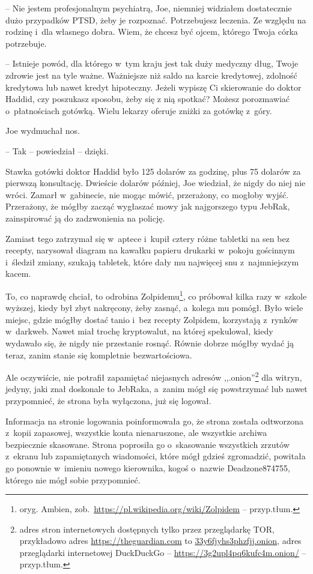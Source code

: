 \documentclass[oneside,polish,11pt,sfheadings]{mwbk}
\begin{document}
-- Nie jestem profesjonalnym psychiatrą, Joe, niemniej widziałem
dostatecznie dużo przypadków PTSD, żeby je rozpoznać. Potrzebujesz
leczenia. Ze względu na rodzinę i~dla własnego dobra. Wiem, że chcesz
być ojcem, którego Twoja córka potrzebuje.

-- Istnieje powód, dla którego w~tym kraju jest tak duży medyczny dług,
Twoje zdrowie jest na tyle ważne. Ważniejsze niż saldo na karcie
kredytowej, zdolność kredytowa lub nawet kredyt hipoteczny. Jeżeli
wypiszę Ci skierowanie do doktor Haddid, czy poszukasz sposobu, żeby się
z nią spotkać? Możesz porozmawiać o~płatnościach gotówką. Wielu lekarzy
oferuje zniżki za gotówkę z~góry.

Joe wydmuchał nos. 

-- Tak -- powiedział -- dzięki.

Stawka gotówki doktor Haddid było 125 dolarów za godzinę, plus 75
dolarów za pierwszą konsultację. Dwieście dolarów później, Joe wiedział,
że nigdy do niej nie wróci. Zamarł w~gabinecie, nie mogąc mówić,
przerażony, co mogłoby wyjść. Przerażony, że mógłby zacząć wygłaszać
mowy jak najgorszego typu JebRak, zainspirować ją do zadzwonienia na
policję.

Zamiast tego zatrzymał się w~aptece i~kupił cztery różne tabletki na sen
bez recepty, narysował diagram na kawałku papieru drukarki w~pokoju
gościnnym i~śledził zmiany, szukają tabletek, które dały mu najwięcej
snu z~najmniejszym kacem.

To, co naprawdę chciał, to odrobina Zolpidemu\footnote{oryg. Ambien,
zob.~\url{https://pl.wikipedia.org/wiki/Zolpidem} -- przyp.tłum.}, co próbował kilka razy w~szkole wyższej, kiedy był zbyt
nakręcony, żeby zasnąć, a~kolega mu pomógł. Było wiele miejsc, gdzie
mógłby dostać tanio i~bez recepty Zolpidem, korzystają z~rynków w~darkweb. Nawet miał trochę kryptowalut, na której spekulował, kiedy
wydawało się, że nigdy nie przestanie rosnąć. Równie dobrze mógłby wydać
ją teraz, zanim stanie się kompletnie bezwartościowa.

Ale oczywiście, nie potrafił zapamiętać niejasnych adresów ,,.onion''\footnote{ adres stron internetowych dostępnych tylko przez przeglądarkę TOR, przykładowo adres 	\url{https://theguardian.com} to \url{33y6fjyhs3phzfjj.onion}, adres przeglądarki internetowej DuckDuckGo -- \url{https://3g2upl4pq6kufc4m.onion/} -- przyp.tłum. }
dla witryn, jedyny, jaki znał doskonale to JebRaka, a~zanim mógł się
powstrzymać lub nawet przypomnieć, że strona była wyłączona, już się
logował.

Informacja na stronie logowania poinformowała go, że strona została
odtworzona z~kopii zapasowej, wszystkie konta nienaruszone, ale
wszystkie archiwa bezpiecznie skasowane. Strona poprosiła go o~skasowanie wszystkich zrzutów z~ekranu lub zapamiętanych wiadomości,
które mógł gdzieś zgromadzić, powitała go ponownie w~imieniu nowego
kierownika, kogoś o~nazwie Deadzone874755, którego nie mógł sobie
przypomnieć.
\end{document}
